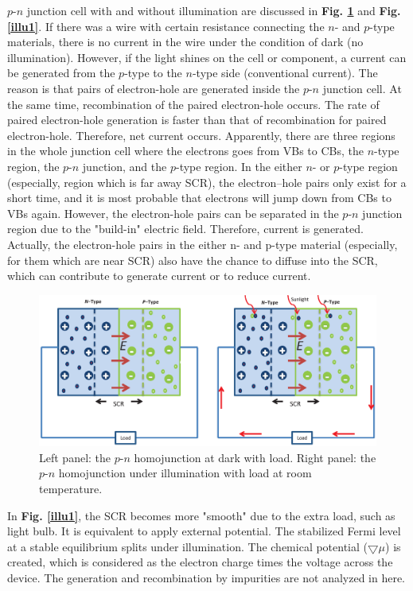 \documentclass[a4paper, 12pt, titlepage,oneside,drop]{kthesis}
\begin{document}
$p$-$n$ junction cell with and without illumination are discussed in \textbf{Fig. \ref{illu}} and \textbf{Fig. \ref{illu1}}. If there was a wire with certain resistance connecting 
the $n$- and $p$-type materials, there is no current in the wire under the condition of dark (no illumination). However, if the light shines on the cell or component, a current can be generated from the $p$-type
to the $n$-type side (conventional current). The reason is that pairs of electron-hole are generated inside the $p$-$n$ junction cell. At the same time, recombination of the paired electron-hole occurs. The rate of paired
electron-hole generation is faster than that of recombination for paired electron-hole. Therefore, net current occurs. Apparently, there are three regions in the whole junction cell where the electrons goes from VBs to CBs, the $n$-type region, the $p$-$n$
junction, and the $p$-type region. In the either $n$- or $p$-type region (especially, region which is far away SCR), the electron–hole pairs only exist for a short time,  and it is most probable that electrons
will jump down from CBs to VBs again. However, the electron-hole pairs can be separated in the $p$-$n$ junction region due to the "build-in" electric field. Therefore, current is generated. Actually, the electron-hole pairs in
the either n- and p-type material (especially, for them which are near SCR) also have the chance to diffuse into the SCR, which can contribute to generate current or to reduce current.

\begin{figure}[H]
\centering
\includegraphics[scale=0.5]{illumination.eps}
\caption{Left panel: the $p$-$n$ homojunction at dark with load. Right panel: the $p$-$n$ homojunction under illumination with load at room temperature.}
\label{illu}
\end{figure}

In \textbf{Fig. \ref{illu1}}, the SCR becomes more "smooth" due to the extra load, such as light bulb. It is equivalent to apply external potential. The stabilized Fermi level at a stable equilibrium splits under illumination.
The chemical potential ($\bigtriangledown \mu$) is created, which is considered as the electron charge times the voltage across the device. The generation and recombination by impurities are not analyzed in here.
\end{document}
